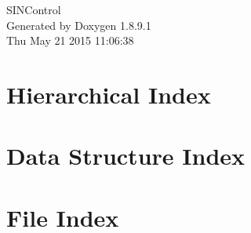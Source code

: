 \documentclass[twoside]{book}
\newcommand{\+}{\discretionary{\mbox{\scriptsize$\hookleftarrow$}}{}{}}
\newcommand{\clearemptydoublepage}{%
  \newpage{\pagestyle{empty}\cleardoublepage}%
}
\begin{document}
\hypersetup{pageanchor=false,
             bookmarks=true,
             bookmarksnumbered=true,
             pdfencoding=unicode
            }
\begin{titlepage}
\vspace*{7cm}
\begin{center}%
{\Large S\+I\+N\+Control }\\
\vspace*{1cm}
{\large Generated by Doxygen 1.8.9.1}\\
\vspace*{0.5cm}
{\small Thu May 21 2015 11:06:38}\\
\end{center}
\end{titlepage}
\clearemptydoublepage
\tableofcontents
\clearemptydoublepage
{}
\hypersetup{pageanchor=true}

\chapter{Hierarchical Index}

\chapter{Data Structure Index}

\chapter{File Index}

\end{document}
